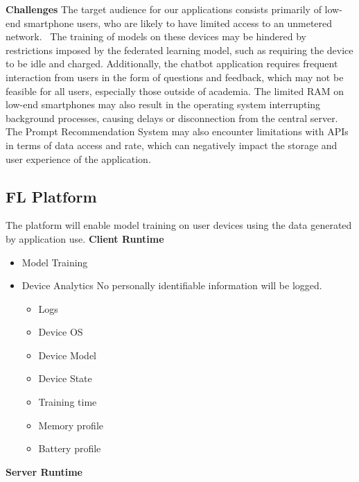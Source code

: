         \textbf{Challenges}
        The target audience for our applications consists primarily of low-end smartphone 
        users, who are likely to have limited access to an unmetered network.~\cite{10.1504/IJMC.2005.006583} The training 
        of models on these devices may be hindered by restrictions imposed by the federated 
        learning model, such as requiring the device to be idle and charged. Additionally, the 
        chatbot application requires frequent interaction from users in the form of questions and 
        feedback, which may not be feasible for all users, especially those outside of academia. 
        The limited RAM on low-end smartphones may also result in the operating system 
        interrupting background processes, causing delays or disconnection from the central 
        server. The Prompt Recommendation System may also encounter limitations with APIs 
        in terms of data access and rate, which can negatively impact the storage and user 
        experience of the application.
    
        \subsection{FL Platform}
        The platform will enable model training on user devices using the data generated by application use.
        \textbf{Client Runtime}
            \begin{itemize}
                \item Model Training
                \item Device Analytics \newline
                    No personally identifiable information will be logged.  
                    \begin{itemize}
                        \item Logs
                        \item Device OS
                        \item Device Model
                        \item Device State
                        \item Training time
                        \item Memory profile
                        \item Battery profile
                    \end{itemize}
            \end{itemize}
        \textbf{Server Runtime}
